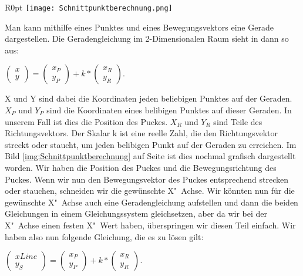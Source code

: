 \begin{wrapfigure}{R}{0pt}
	\vspace{-15pt}
	\texttt{[image: Schnittpunktberechnung.png]}
	\vspace{-15pt}
	\caption{Veranschaulichung der Schnittpunktberechnung}
	\vspace{-15pt}
	\label{img:Schnittpunktberechnung}
\end{wrapfigure}

Man kann mithilfe eines Punktes und eines Bewegungsvektors eine Gerade dargestellen. Die Geradengleichung im 2-Dimensionalen Raum sieht in dann so aus: 

$\left(\begin{array}{c} x \\ y \end{array}\right) = \left(\begin{array}{c} x_P \\ y_P \end{array}\right) + k * \left(\begin{array}{c} x_R \\ y_R \end{array}\right)$. 

X und Y sind dabei die Koordinaten jeden beliebigen Punktes auf der Geraden. $X_P$ und $Y_P$ sind die Koordinaten eines belibigen Punktes auf dieser Geraden. In unserem Fall ist dies die Position des Puckes. $X_R$ und $Y_R$ sind Teile des Richtungsvektors. Der Skalar k ist eine reelle Zahl, die den Richtungsvektor streckt oder staucht, um jeden belibigen Punkt auf der Geraden zu erreichen. Im Bild \ref{img:Schnittpunktberechnung} auf Seite \pageref{img:Schnittpunktberechnung} ist dies nochmal grafisch dargestellt worden. Wir haben die Position des Puckes und die Bewegungsrichtung des Puckes. Wenn wir nun den Bewegungsvektor des Puckes entsprechend strecken oder stauchen, schneiden wir die gewünschte X"~Achse. Wir könnten nun für die gewünschte X"~Achse auch eine Geradengleichung aufstellen und dann die beiden Gleichungen in einem Gleichungssystem gleichsetzen, aber da wir bei der X"~Achse einen festen X"~Wert haben, überspringen wir diesen Teil einfach. Wir haben also nun folgende Gleichung, die es zu lösen gilt: 

$\left(\begin{array}{c} xLine \\ y_S \end{array}\right) = \left(\begin{array}{c} x_P \\ y_P \end{array}\right) + k * \left(\begin{array}{c} x_R \\ y_R \end{array}\right)$. 

